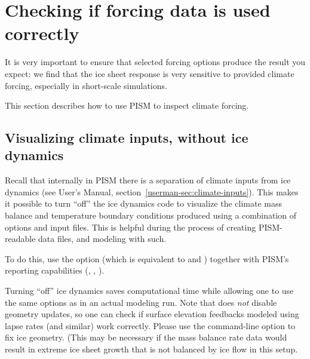 \documentclass[titlepage,letterpaper,final]{scrartcl}
\begin{document}
\section{Checking if forcing data is used correctly}
\label{sec:checking-forcing}

It is very important to ensure that selected forcing options produce the result you expect: we find that the ice sheet response is very sensitive to provided climate forcing, especially in short-scale simulations.

This section describes how to use PISM to inspect climate forcing.

\subsection{Visualizing climate inputs, without ice dynamics}
\label{sec:visualize-climate}

Recall that internally in PISM there is a separation of climate inputs from ice dynamics (see User's Manual, section~\ref*{userman-sec:climate-inputs}). This makes it possible to turn ``off'' the ice dynamics code to visualize the climate mass balance and temperature boundary conditions produced using a combination of options and input files. This is helpful during the process of creating PISM-readable data files, and modeling with such.

To do this, use the option  (which is equivalent to  and ) together with PISM's reporting capabilities (, , ).

Turning ``off'' ice dynamics saves computational time while allowing one to use the same options as in an actual modeling run. Note that  does \emph{not} disable geometry updates, so one can check if surface elevation feedbacks modeled using lapse rates (and similar) work correctly. Please use the  command-line option to fix ice geometry. (This may be necessary if the mass balance rate data would result in extreme ice sheet growth that is not balanced by ice flow in this setup.
\end{document}
